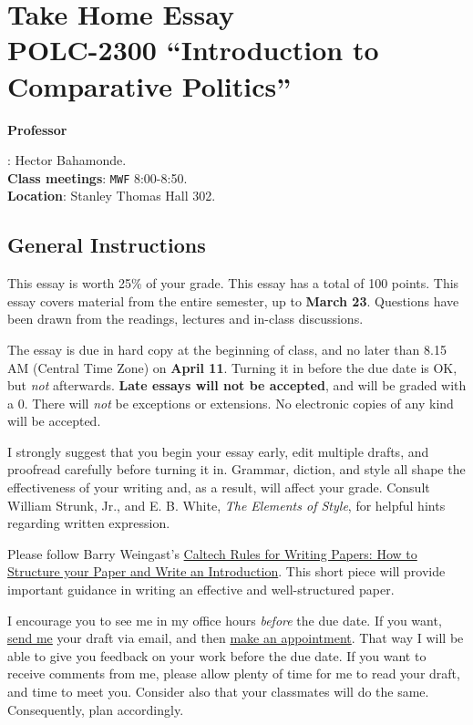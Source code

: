 \documentclass{article}
\begin{document}
\setlength{\parindent}{0em}
\setlength{\parskip}{0.5em}
 
{\centering\section*{{\bf Take Home Essay}\\{\bf POLC-2300 ``Introduction to Comparative Politics''}}}


{\vspace{.5cm}\raggedright \bf Professor}: Hector Bahamonde.\\
{\bf Class meetings}: \texttt{MWF} 8:00-8:50.\\
{\bf Location}: Stanley Thomas Hall 302.


\subsection*{General Instructions}

This essay is worth 25\% of your grade. This essay has a total of 100 points. This essay covers material from the entire semester, up to {\bf  March 23}. Questions have been drawn from the readings, lectures and in-class discussions. 

{\color{blue}The essay is due in hard copy at the beginning of class, and no later than 8.15 AM (Central Time Zone) on {\bf April 11}}. Turning it in before the due date is OK, but \emph{not} afterwards. {\bf Late essays will not be accepted}, and will be graded with a $0$. There will \emph{not} be exceptions or extensions. No electronic copies of any kind will be accepted.

I strongly suggest that you begin your essay early, edit multiple drafts, and proofread carefully before turning it in. Grammar, diction, and style all shape the effectiveness of your writing and, as a result, will affect your grade. Consult William Strunk, Jr., and E. B. White, \emph{The Elements of Style}, for helpful hints regarding written expression. 

Please follow Barry Weingast's \href{https://web.stanford.edu/group/mcnollgast/cgi-bin/wordpress/wp-content/uploads/2013/10/CALTECH.RUL_..pdf}{Caltech Rules for Writing Papers: How to Structure your Paper and Write an Introduction}. This short piece will provide important guidance in writing an effective and well-structured paper. 

I encourage you to see me in my office hours \emph{before} the due date. If you want, \href{mailto:\filetext}{send me} your draft via email, and then \href{https://calendly.com/bahamonde/officehours}{make an appointment}. That way I will be able to give you feedback on your work before the due date. If you want to receive comments from me, please allow plenty of time for me to read your draft, and time to meet you. Consider also that your classmates will do the same. Consequently, plan accordingly.
\end{document}
